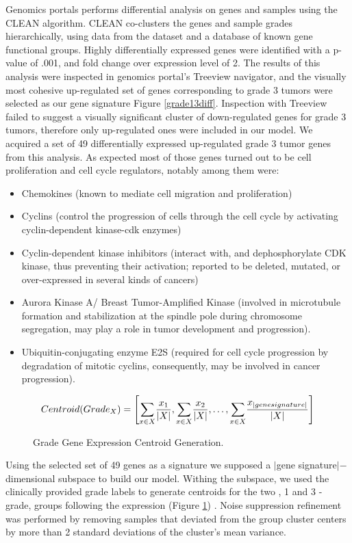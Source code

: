\documentclass[a4paper,10pt]{article}
\begin{document}
Genomics portals performs differential analysis on genes and samples using the CLEAN algorithm\cite{CLEAN}. 
CLEAN co-clusters
the genes and sample grades hierarchically, using data from the dataset and a database of known gene functional groups. Highly differentially
expressed genes were identified with a p-value of .001, and fold change over expression level of 2. The results of this analysis
were inspected in genomics portal's Treeview navigator\cite{Treeview}, and the visually most cohesive up-regulated set of genes
corresponding to grade 3 tumors were selected as our gene signature Figure \ref{grade13diff}. 
Inspection with Treeview failed to suggest a 
visually significant cluster of down-regulated genes for grade 3 tumors, therefore only up-regulated ones were included in our model. 
We acquired a set of 49 differentially expressed up-regulated grade 3 tumor genes from this analysis.
As expected most of those genes turned out to be cell proliferation and cell cycle regulators, notably among them were:
\begin{itemize}
\item Chemokines (known to mediate cell migration and proliferation)
\item Cyclins (control the progression of cells through the cell cycle by activating cyclin-dependent kinase-cdk enzymes)
\item Cyclin-dependent kinase inhibitors  (interact with, and dephosphorylate CDK kinase,  thus preventing their activation; reported to be deleted, mutated, or over-expressed in several kinds of cancers)
\item Aurora Kinase A/ Breast Tumor-Amplified Kinase (involved in microtubule formation and stabilization at the spindle pole during chromosome segregation, may play a role  in tumor development and progression).
\item Ubiquitin-conjugating enzyme E2S (required for cell cycle progression by degradation of mitotic cyclins, consequently, may be involved in cancer progression).
\end{itemize}

\begin{figure}
$$
Centroid(Grade_X)= \left[              \underset{x\in X}     \sum{  { {x_1}    \over {| X |} } }   ,   
 \underset{x\in X}     \sum{  { {x_2}    \over {| X |} } },
\ldots ,
 \underset{x\in X}     \sum{  { {x_{| gene signature |}}    \over {| X |} } }                 \right] 
$$
\caption{Grade Gene Expression Centroid Generation.}\label{centroid}
\end{figure}
Using the selected set of 49 genes as a signature we supposed a $|$gene signature$|-$dimensional subspace to build our model.
Withing the subspace, we used the clinically provided grade labels to generate centroids for the two , 1 and 3 - grade, groups following
the expression (Figure \ref{centroid}) . Noise suppression refinement was performed by removing samples that deviated from the group cluster
centers by more than 2 standard deviations of the cluster's mean variance.\\
\end{document}
